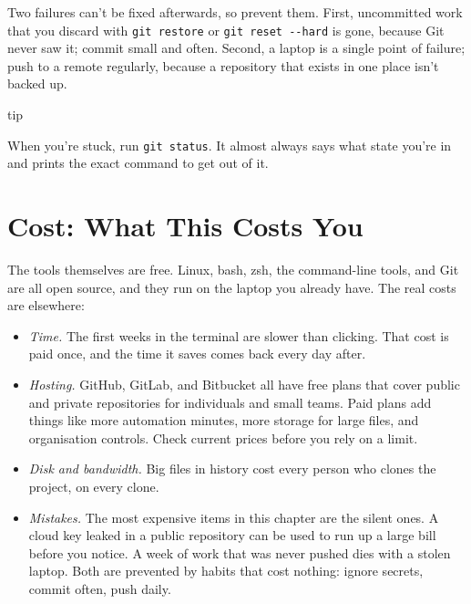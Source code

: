 Two failures can't be fixed afterwards, so prevent them. First, uncommitted work that you discard with \texttt{git\ restore} or \texttt{git\ reset\ -\/-hard} is gone, because Git never saw it; commit small and often. Second, a laptop is a single point of failure; push to a remote regularly, because a repository that exists in one place isn't backed up.

\begin{callout}{tip}

When you're stuck, run \texttt{git\ status}. It almost always says what state you're in and prints the exact command to get out of it.

\end{callout}

\section{Cost: What This Costs You}\label{12-security-speed-failure-and-cost:cost-what-this-costs-you}

The tools themselves are free. Linux, bash, zsh, the command-line tools, and Git are all open source, and they run on the laptop you already have. The real costs are elsewhere:

\begin{itemize}
\tightlist
\item
  \emph{Time.} The first weeks in the terminal are slower than clicking. That cost is paid once, and the time it saves comes back every day after.
\item
  \emph{Hosting.} GitHub, GitLab, and Bitbucket all have free plans that cover public and private repositories for individuals and small teams. Paid plans add things like more automation minutes, more storage for large files, and organisation controls. Check current prices before you rely on a limit.
\item
  \emph{Disk and bandwidth.} Big files in history cost every person who clones the project, on every clone.
\item
  \emph{Mistakes.} The most expensive items in this chapter are the silent ones. A cloud key leaked in a public repository can be used to run up a large bill before you notice. A week of work that was never pushed dies with a stolen laptop. Both are prevented by habits that cost nothing: ignore secrets, commit often, push daily.
\end{itemize}
